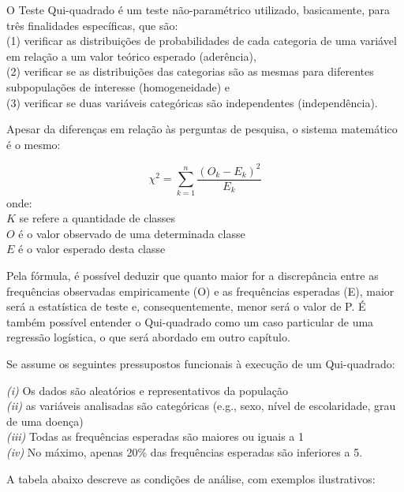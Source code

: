 \documentclass[
]{book}
\begin{document}
O Teste Qui-quadrado é um teste não-paramétrico utilizado, basicamente,
para três finalidades específicas, que são:\\
(1) verificar as distribuições de probabilidades de cada categoria de
uma variável em relação a um valor teórico esperado (aderência),\\
(2) verificar se as distribuições das categorias são as mesmas para
diferentes subpopulações de interesse (homogeneidade) e\\
(3) verificar se duas variáveis categóricas são independentes
(independência).

Apesar da diferenças em relação às perguntas de pesquisa, o sistema
matemático é o mesmo:

\[\chi^2=\sum_{k=1}^{n} \frac{(O_k - E_k)^2}{E_k}\] onde:\\
\(K\) se refere a quantidade de classes\\
\(O\) é o valor observado de uma determinada classe\\
\(E\) é o valor esperado desta classe

Pela fórmula, é possível deduzir que quanto maior for a discrepância
entre as frequências observadas empiricamente (O) e as frequências
esperadas (E), maior será a estatística de teste e, consequentemente,
menor será o valor de P. É também possível entender o Qui-quadrado como
um caso particular de uma regressão logística, o que será abordado em
outro capítulo.

Se assume os seguintes pressupostos funcionais à execução de um
Qui-quadrado:

\emph{(i)} Os dados são aleatórios e representativos da população\\
\emph{(ii)} as variáveis analisadas são categóricas (e.g., sexo, nível
de escolaridade, grau de uma doença)\\
\emph{(iii)} Todas as frequências esperadas são maiores ou iguais a 1\\
\emph{(iv)} No máximo, apenas 20\% das frequências esperadas são
inferiores a 5.

A tabela abaixo descreve as condições de análise, com exemplos
ilustrativos:
\end{document}
